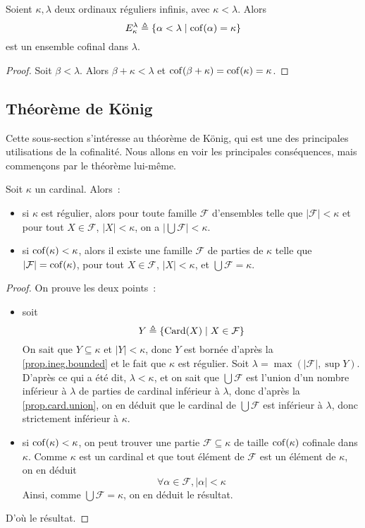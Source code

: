 \begin{proposition}
  Soient $\kappa, \lambda$ deux ordinaux réguliers infinis, avec
  $\kappa < \lambda$. Alors
  \[E_\kappa^\lambda \triangleq \{\alpha < \lambda \mid \operatorname{cof}(\alpha) = \kappa\}\]
  est un ensemble cofinal dans $\lambda$.
\end{proposition}

\begin{proof}
  Soit $\beta < \lambda$. Alors $\beta + \kappa < \lambda$ et
  $\operatorname{cof}(\beta + \kappa) = \operatorname{cof}(\kappa) = \kappa$.
\end{proof}

\subsection{Théorème de König}

Cette sous-section s'intéresse au théorème de König, qui est une des principales
utilisations de la cofinalité. Nous allons en voir les principales conséquences,
mais commençons par le théorème lui-même.

\begin{theorem}\label{thm.Konig}
  Soit $\kappa$ un cardinal. Alors~:
  \begin{itemize}
  \item si $\kappa$ est régulier, alors pour toute famille $\mathcal F$
    d'ensembles telle que $|\mathcal F| < \kappa$ et pour tout $X\in\mathcal F$,
    $|X| < \kappa$, on a $\displaystyle\Big|\bigcup \mathcal F\Big| < \kappa$.
  \item si $\operatorname{cof}(\kappa) < \kappa$, alors il existe une famille $\mathcal F$
    de parties de $\kappa$ telle que $|\mathcal F| = \operatorname{cof}(\kappa)$, pour tout
    $X\in\mathcal F$, $|X|<\kappa$, et $\displaystyle\bigcup\mathcal F =\kappa$.
  \end{itemize}
\end{theorem}

\begin{proof}
  On prouve les deux points~:
  \begin{itemize}
  \item soit
    \[Y \triangleq \{\operatorname{Card}(X) \mid X \in \mathcal F\}\]
    On sait que $Y\subseteq \kappa$ et $|Y| < \kappa$, donc $Y$ est bornée
    d'après la \cref{prop.ineg.bounded} et le fait que $\kappa$ est régulier.
    Soit $\lambda = \max(|\mathcal F|, \sup Y)$. D'après ce qui a été dit,
    $\lambda < \kappa$, et on sait que $\bigcup \mathcal F$ est l'union d'un
    nombre inférieur à $\lambda$ de parties de cardinal inférieur à $\lambda$,
    donc d'après la \cref{prop.card.union}, on en déduit que le cardinal de
    $\bigcup \mathcal F$ est inférieur à $\lambda$, donc strictement inférieur
    à $\kappa$.
  \item si $\operatorname{cof}(\kappa) < \kappa$, on peut trouver une partie
    $\mathcal F\subseteq \kappa$ de taille $\operatorname{cof}(\kappa)$ cofinale dans
    $\kappa$. Comme $\kappa$ est un cardinal et que tout élément de $\mathcal F$
    est un élément de $\kappa$, on en déduit
    \[\forall \alpha \in \mathcal F, |\alpha| < \kappa\]
    Ainsi, comme $\bigcup \mathcal F = \kappa$, on en déduit le résultat.
  \end{itemize}
  D'où le résultat.
\end{proof}


